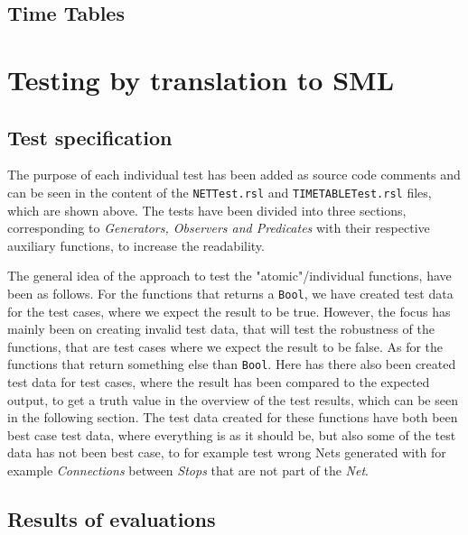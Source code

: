 \documentclass[a4]{article}
\begin{document}
\subsection{Time Tables}



\section{Testing by translation to SML}

\subsection{Test specification}

The purpose of each individual test has been added as source code comments and can be seen in the content of the \verb=NETTest.rsl=  and \verb=TIMETABLETest.rsl= files, which are shown above. The tests have been divided into three sections, corresponding to \emph{Generators, Observers and Predicates} with their respective auxiliary functions, to increase the readability.

The general idea of the approach to test the "atomic"/individual functions, have been as follows. For the functions that returns a \verb=Bool=, we have created test data for the test cases, where we expect the result to be true. However, the focus has mainly been on creating invalid test data, that will test the robustness of the functions, that are test cases where we expect the result to be false. As for the functions that return something else than \verb=Bool=. Here has there also been created test data for test cases, where the result has been compared to the expected output, to get a truth value in the overview of the test results, which can be seen in the following section. The test data created for these functions have both been best case test data, where everything is as it should be, but also some of the test data has not been best case, to for example test wrong Nets generated with for example \emph{Connections} between \emph{Stops} that are not part of the \emph{Net}.

\subsection{Results of evaluations}
\end{document}
